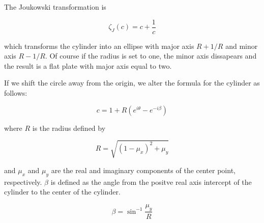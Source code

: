 The Joukowski transformation is

\begin{equation}
\label{eqn:jouktrans}
	\zeta_J(c) = c + \frac{1}{c}
\end{equation}

which transforms the cylinder into an ellipse with major axis $R + 1/R$ and minor axis $R - 1/R$. Of course if the radius is set to one, the minor axis dissapears and the result is a flat plate with major axis equal to two.

If we shift the circle away from the origin, we alter the formula for the cylinder as follows:

\begin{equation}
\label{eqn:complexfoil}
	c = 1+R \left(e^{i \theta}-e^{-i\beta} \right)
\end{equation}

where $R$ is the radius defined by

\begin{equation}
\label{eqn:radius}
	R = \sqrt{(1-\mu_x)^2 + \mu_y}
\end{equation}

and $\mu_x$ and $\mu_y$ are the real and imaginary components of the center point, respectively.  $\beta$ is defined as the angle from the positve real axis intercept of the cylinder to the center of the cylinder.

\begin{equation}
	\beta = \sin^{-1}\frac{\mu_y}{R}
\end{equation}

